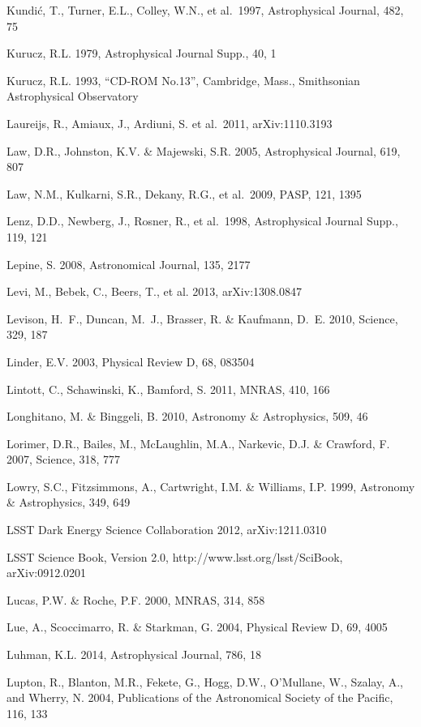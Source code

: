 \documentclass{emulateapj}
\begin{document}
\begin{thebibliography}{}
\bibitem[()]{} Kundi\'{c}, T., Turner, E.L., Colley, W.N., et al.~1997, Astrophysical Journal, 482, 75

\bibitem[()]{} Kurucz, R.L. 1979, Astrophysical Journal Supp., 40, 1

\bibitem[()]{} Kurucz, R.L. 1993, ``CD-ROM No.13”, Cambridge, Mass., Smithsonian Astrophysical Observatory

\bibitem[()]{} Laureijs, R., Amiaux, J., Ardiuni, S. et al.~2011, arXiv:1110.3193

\bibitem[()]{} Law, D.R., Johnston, K.V. \& Majewski, S.R. 2005,  Astrophysical Journal, 619, 807

\bibitem[()]{} Law, N.M., Kulkarni, S.R., Dekany, R.G., et al.~2009, PASP, 121, 1395

\bibitem[()]{} Lenz, D.D., Newberg, J., Rosner, R., et al.~1998, Astrophysical Journal Supp., 119, 121

\bibitem[()]{} Lepine, S. 2008, Astronomical Journal, 135, 2177

\bibitem[()]{} Levi, M., Bebek, C., Beers, T., et al. 2013, arXiv:1308.0847

\bibitem[()]{} Levison, H.~F., Duncan, M.~J., Brasser, R. \& Kaufmann, D.~E. 2010, Science, 329, 187

\bibitem[()]{} Linder, E.V. 2003, Physical Review D, 68, 083504
	
\bibitem[()]{} Lintott, C., Schawinski, K., Bamford, S. 2011, MNRAS,
  410, 166

\bibitem[()]{} Longhitano, M. \& Binggeli, B. 2010, Astronomy \& Astrophysics, 509, 46

\bibitem[()]{} Lorimer, D.R., Bailes, M., McLaughlin, M.A., Narkevic, D.J. \& Crawford, F. 2007, Science, 318, 777	

\bibitem[()]{} Lowry, S.C., Fitzsimmons, A., Cartwright, I.M. \& Williams, I.P. 1999, Astronomy \& 
             Astrophysics, 349, 649

\bibitem[()]{} LSST Dark Energy Science Collaboration 2012, arXiv:1211.0310

\bibitem[()]{} LSST Science Book, Version 2.0,
  http://www.lsst.org/lsst/SciBook, arXiv:0912.0201

\bibitem[()]{} Lucas, P.W. \& Roche, P.F. 2000, MNRAS, 314, 858
	
\bibitem[()]{} Lue, A., Scoccimarro, R. \& Starkman, G. 2004, Physical Review D, 69, 4005

\bibitem[()]{} Luhman, K.L. 2014,  Astrophysical Journal, 786, 18 

\bibitem[()]{} Lupton, R., Blanton, M.R., Fekete, G., Hogg, D.W.,
  O'Mullane, W., Szalay, A., and Wherry, N. 2004, Publications of the
  Astronomical Society of the Pacific, 116, 133


\end{thebibliography}
\end{document}
